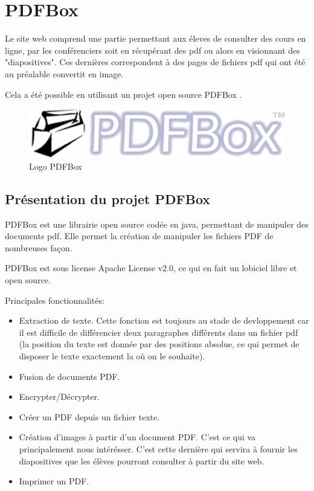 \chapter{PDFBox}
    Le site web comprend une partie permettant aux éleves de consulter des cours 
en ligne, par les conférenciers soit en récupérant des pdf ou alors en visionnant
des "diapositives". Ces dernières correspondent à des pages de fichiers pdf qui
ont été au préalable convertit en image. 

    Cela a été possible en utilisant un projet open source PDFBox \cite{pdfbox}.
\newline
\newline

    \begin{figure}[h]
        \begin{center}
            \includegraphics[scale=0.6]{PDFBox.png} 
        \end{center}

        \caption{Logo PDFBox}
        \label{Logo PDFBox}
    \end{figure}

\newpage



	\section{Présentation du projet PDFBox}
	PDFBox est une librairie open source codée en java, permettant de manipuler 
des documents pdf. Elle permet la création de manipuler les fichiers PDF de 
nombreuses façon.

	PDFBox est sous license Apache License v2.0, ce qui en fait un lobiciel libre 
et open source.

	Principales fonctionnalités:
	\begin{itemize}
		\item Extraction de texte.
		      Cette fonction est toujours au stade de devloppement car il est difficile de 
              différencier deux paragraphes différents dans un fichier pdf (la position 
              du texte est donnée par des positions absolue, ce qui permet de disposer 
              le texte exactement la où on le souhaite).  
		\item Fusion de documents PDF. 
		\item Encrypter/Décrypter.
		\item Créer un PDF depuis un fichier texte.
		\item Création d'images à partir d'un document PDF. C'est ce qui va 
              principalement nous intérésser. C'est cette dernière qui servira à 
              fournir les diapositives que les élèves pourront consulter à partir 
              du site web.
		\item Imprimer un PDF.
	\end{itemize}

